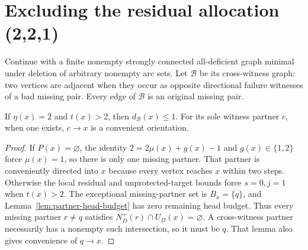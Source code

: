 \section{Excluding the residual allocation (2,2,1)}
\label{sec:exclude-two-two-one}

Continue with a finite nonempty strongly connected all-deficient graph
minimal under deletion of arbitrary nonempty arc sets.
Let $\mathcal B$ be its cross-witness graph: two vertices are adjacent
when they occur as opposite directional failure witnesses of a bad
missing pair. Every edge of $\mathcal B$ is an original missing pair.

\begin{lemma}
\label{lem:eta-two-witness-degree}
If $\eta(x)=2$ and $t(x)>2$, then $d_{\mathcal B}(x)\le1$.
For its sole witness partner $c$, when one exists, $c\to x$ is a
convenient orientation.
\end{lemma}
\begin{proof}
If $P(x)=\varnothing$, the identity
$2=2\mu(x)+g(x)-1$ and $g(x)\in\{1,2\}$ force
$\mu(x)=1$, so there is only one missing partner.
That partner is conveniently directed into $x$ because every vertex
reaches $x$ within two steps.
Otherwise the local residual and unprotected-target bounds force
$s=0,j=1$ when $t(x)>2$. The exceptional missing-partner set is
$B_x=\{q\}$, and Lemma~\ref{lem:partner-head-budget} has zero
remaining head budget. Thus every missing partner $r\ne q$ satisfies
$N_D^+(r)\cap U_D(x)=\varnothing$.
A cross-witness partner necessarily has a nonempty such intersection,
so it must be $q$. That lemma also gives convenience of $q\to x$.
\end{proof}

